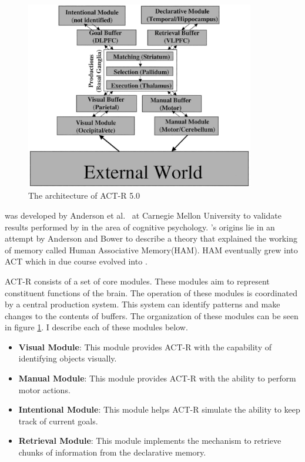 \begin{figure}[htp]
  \centering
  \includegraphics[width=100mm]{ACTRArch}
  \caption{The architecture of ACT-R 5.0\cite{anderson_jr-etal:2004a}}
  \label{ACTR_ARCH}
\end{figure}



\actr was developed by Anderson et al.~\cite{anderson_jr-etal:2004a}
at Carnegie Mellon University to validate results performed by in the
area of cognitive psychology. \actr's origins lie in an attempt by
Anderson and Bower to describe a theory that explained the working of
memory called Human Associative Memory(HAM)\cite{AndersonBower73}. HAM
eventually grew into {\small ACT}\cite{Anderson76} which in due course evolved
into \actr\cite{Anderson83}.

ACT-R consists of a set of core modules. These modules aim to
represent constituent functions of the brain. The operation of these
modules is coordinated by a central production system. This system can
identify patterns and make changes to the contents of buffers. The
organization of these modules can be seen in figure \ref{ACTR_ARCH}. I
describe each of these modules below.

\begin{itemize}
\item {\bf Visual Module}: This module provides ACT-R with the capability of
  identifying objects visually.
\item {\bf Manual Module}: This module provides ACT-R with the ability to
  perform motor actions.
\item {\bf Intentional Module}: This module helps ACT-R simulate the
  ability to keep track of current goals.
\item {\bf Retrieval Module}: This module implements the mechanism to
  retrieve chunks of information from the declarative memory.
\end{itemize}

